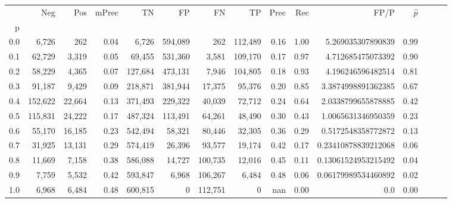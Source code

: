 \begin{tabular}{rrrrrrrrrrrrrrr}
\toprule
{} &      Neg &     Pos & mPrec &       TN &       FP &       FN &       TP &  Prec &   Rec &                 FP/P & $\hat{p}$ \\
p   &          &         &       &          &          &          &          &       &       &                      &           \\
\midrule
0.0 &    6,726 &     262 &  0.04 &    6,726 &  594,089 &      262 &  112,489 &  0.16 &  1.00 &    5.269035307890839 &      0.99 \\
0.1 &   62,729 &   3,319 &  0.05 &   69,455 &  531,360 &    3,581 &  109,170 &  0.17 &  0.97 &    4.712685475073392 &      0.90 \\
0.2 &   58,229 &   4,365 &  0.07 &  127,684 &  473,131 &    7,946 &  104,805 &  0.18 &  0.93 &    4.196246596482514 &      0.81 \\
0.3 &   91,187 &   9,429 &  0.09 &  218,871 &  381,944 &   17,375 &   95,376 &  0.20 &  0.85 &   3.3874998891362385 &      0.67 \\
0.4 &  152,622 &  22,664 &  0.13 &  371,493 &  229,322 &   40,039 &   72,712 &  0.24 &  0.64 &   2.0338799655878885 &      0.42 \\
0.5 &  115,831 &  24,222 &  0.17 &  487,324 &  113,491 &   64,261 &   48,490 &  0.30 &  0.43 &   1.0065631346950359 &      0.23 \\
0.6 &   55,170 &  16,185 &  0.23 &  542,494 &   58,321 &   80,446 &   32,305 &  0.36 &  0.29 &   0.5172548358772872 &      0.13 \\
0.7 &   31,925 &  13,131 &  0.29 &  574,419 &   26,396 &   93,577 &   19,174 &  0.42 &  0.17 &  0.23410878839212068 &      0.06 \\
0.8 &   11,669 &   7,158 &  0.38 &  586,088 &   14,727 &  100,735 &   12,016 &  0.45 &  0.11 &  0.13061524953215492 &      0.04 \\
0.9 &    7,759 &   5,532 &  0.42 &  593,847 &    6,968 &  106,267 &    6,484 &  0.48 &  0.06 &  0.06179989534460892 &      0.02 \\
1.0 &    6,968 &   6,484 &  0.48 &  600,815 &        0 &  112,751 &        0 &   nan &  0.00 &                  0.0 &      0.00 \\
\bottomrule
\end{tabular}

